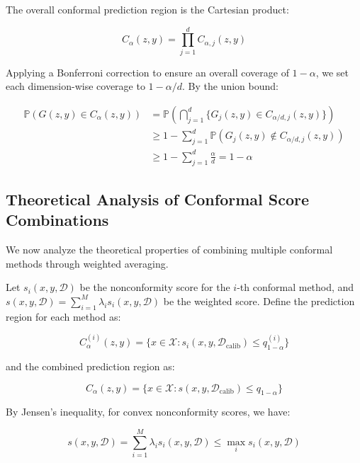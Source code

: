 \documentclass{article}
\theoremstyle{plain}
\theoremstyle{definition}
\theoremstyle{remark}
\begin{document}
The overall conformal prediction region is the Cartesian product:

\begin{equation}
C_{\alpha}(z, y) = \prod_{j=1}^d C_{\alpha,j}(z, y)
\end{equation}

Applying a Bonferroni correction to ensure an overall coverage of $1-\alpha$, we set each dimension-wise coverage to $1-\alpha/d$. By the union bound:

\begin{align}
\mathbb{P}(G(z, y) \in C_{\alpha}(z, y)) &= \mathbb{P}\left(\bigcap_{j=1}^d \{G_j(z, y) \in C_{\alpha/d,j}(z, y)\}\right) \\
&\geq 1 - \sum_{j=1}^d \mathbb{P}(G_j(z, y) \not\in C_{\alpha/d,j}(z, y)) \\
&\geq 1 - \sum_{j=1}^d \frac{\alpha}{d} = 1 - \alpha
\end{align}

\subsection{Theoretical Analysis of Conformal Score Combinations}

We now analyze the theoretical properties of combining multiple conformal methods through weighted averaging.

Let $s_i(x, y, \mathcal{D})$ be the nonconformity score for the $i$-th conformal method, and $s(x, y, \mathcal{D}) = \sum_{i=1}^M \lambda_i s_i(x, y, \mathcal{D})$ be the weighted score. Define the prediction region for each method as:

\begin{equation}
C_{\alpha}^{(i)}(z, y) = \{x \in \mathcal{X}: s_i(x, y, \mathcal{D}_{\text{calib}}) \leq q_{1-\alpha}^{(i)}\}
\end{equation}

and the combined prediction region as:

\begin{equation}
C_{\alpha}(z, y) = \{x \in \mathcal{X}: s(x, y, \mathcal{D}_{\text{calib}}) \leq q_{1-\alpha}\}
\end{equation}

By Jensen's inequality, for convex nonconformity scores, we have:

\begin{equation}
s(x, y, \mathcal{D}) = \sum_{i=1}^M \lambda_i s_i(x, y, \mathcal{D}) \leq \max_i s_i(x, y, \mathcal{D})
\end{equation}
\end{document}
